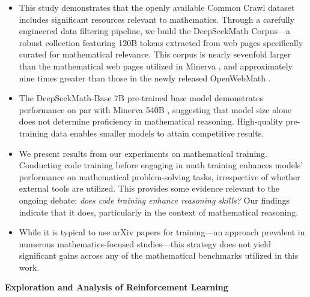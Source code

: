 \begin{itemize}[topsep=0pt]
    \item This study demonstrates that the openly available Common Crawl dataset includes significant resources relevant to mathematics. Through a carefully engineered data filtering pipeline, we build the DeepSeekMath Corpus—a robust collection featuring 120B tokens extracted from web pages specifically curated for mathematical relevance. This corpus is nearly sevenfold larger than the mathematical web pages utilized in Minerva \citep{minerva}, and approximately nine times greater than those in the newly released OpenWebMath \citep{openwebmath}.

\item The DeepSeekMath-Base 7B pre-trained base model demonstrates performance on par with Minerva 540B \citep{minerva}, suggesting that model size alone does not determine proficiency in mathematical reasoning. High-quality pre-training data enables smaller models to attain competitive results.

\item We present results from our experiments on mathematical training. Conducting code training before engaging in math training enhances models' performance on mathematical problem-solving tasks, irrespective of whether external tools are utilized. This provides some evidence relevant to the ongoing debate: \textit{does code training enhance reasoning skills?} Our findings indicate that it does, particularly in the context of mathematical reasoning.

\item While it is typical to use arXiv papers for training—an approach prevalent in numerous mathematics-focused studies—this strategy does not yield significant gains across any of the mathematical benchmarks utilized in this work.
\end{itemize}

\textbf{Exploration and Analysis of Reinforcement Learning}

